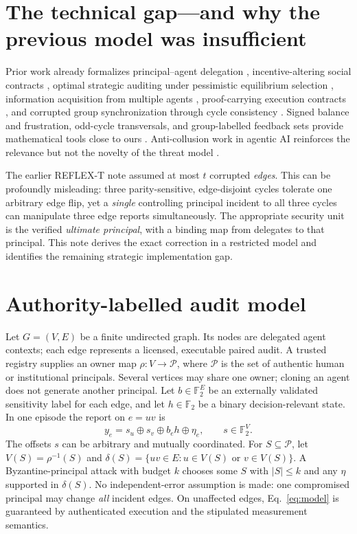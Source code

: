 \documentclass[10pt,a4paper]{article}
\theoremstyle{definition}\newtheorem{definition}[theorem]{Definition}
\newcommand{\F}{\mathbb F_2}
\newcommand{\Princ}{\mathcal P}
\newcommand{\xor}{\mathbin{\oplus}}
\begin{document}
\section{The technical gap---and why the previous model was insufficient}
Prior work already formalizes principal--agent delegation \cite{sourbut2024}, incentive-altering social contracts \cite{davoust2020}, optimal strategic auditing under pessimistic equilibrium selection \cite{das2026}, information acquisition from multiple agents \cite{cacciamani2024}, proof-carrying execution contracts \cite{ciliberto2026}, and corrupted group synchronization through cycle consistency \cite{lerman2021}. Signed balance and frustration, odd-cycle transversals, and group-labelled feedback sets provide mathematical tools close to ours \cite{zaslavsky2010,cygan2010,jansen2024}. Anti-collusion work in agentic AI reinforces the relevance but not the novelty of the threat model \cite{collusion2026,colosseum2026}.

The earlier REFLEX-T note assumed at most $t$ corrupted \emph{edges}. This can be profoundly misleading: three parity-sensitive, edge-disjoint cycles tolerate one arbitrary edge flip, yet a \emph{single} controlling principal incident to all three cycles can manipulate three edge reports simultaneously. The appropriate security unit is the verified \emph{ultimate principal}, with a binding map from delegates to that principal. This note derives the exact correction in a restricted model and identifies the remaining strategic implementation gap.

\section{Authority-labelled audit model}
Let $G=(V,E)$ be a finite undirected graph. Its nodes are delegated agent contexts; each edge represents a licensed, executable paired audit. A trusted registry supplies an owner map $\rho:V\to\Princ$, where $\Princ$ is the set of authentic human or institutional principals. Several vertices may share one owner; cloning an agent does not generate another principal. Let $b\in\F^E$ be an externally validated sensitivity label for each edge, and let $h\in\F$ be a binary decision-relevant state. In one episode the report on $e=uv$ is
\begin{equation}\label{eq:model}
 y_e=s_u\xor s_v\xor b_e h\xor \eta_e,\qquad s\in\F^V.
\end{equation}
The offsets $s$ can be arbitrary and mutually coordinated. For $S\subseteq\Princ$, let $V(S)=\rho^{-1}(S)$ and $\delta(S)=\{uv\in E:u\in V(S)\text{ or }v\in V(S)\}$. A Byzantine-principal attack with budget $k$ chooses some $S$ with $|S|\le k$ and any $\eta$ supported in $\delta(S)$. No independent-error assumption is made: one compromised principal may change \emph{all} incident edges. On unaffected edges, Eq.~\eqref{eq:model} is guaranteed by authenticated execution and the stipulated measurement semantics.
\end{document}
